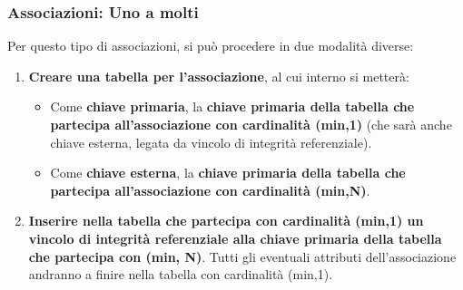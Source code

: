 \documentclass[12pt]{report}
\begin{document}
	\subsubsection{Associazioni: Uno a molti}
	Per questo tipo di associazioni, si può procedere in due modalità diverse:
	\begin{enumerate}
		\item \textbf{Creare una tabella per l'associazione}, al cui interno si metterà:
		\begin{itemize}
			\item Come \textbf{chiave primaria}, la \textbf{chiave primaria della tabella che partecipa all'associazione con cardinalità (min,1)} (che sarà anche chiave esterna, legata da vincolo di integrità referenziale).
			\item Come \textbf{chiave esterna}, la \textbf{chiave primaria della tabella che partecipa all'associazione con cardinalità (min,N)}.
		\end{itemize}
		
		\item \textbf{Inserire nella tabella che partecipa con cardinalità (min,1) un vincolo di integrità referenziale alla chiave primaria della tabella che partecipa con (min, N)}. Tutti gli eventuali attributi dell'associazione andranno a finire nella tabella con cardinalità (min,1).
	\end{enumerate}
	
\end{document}
